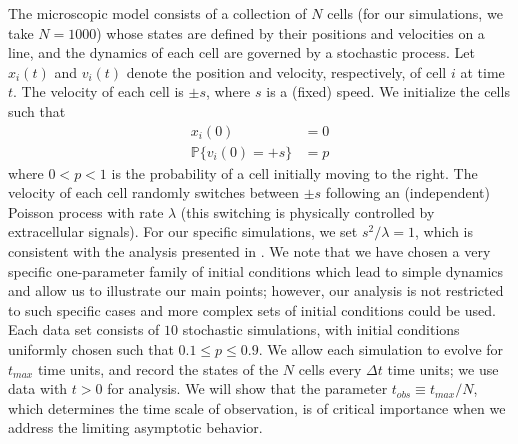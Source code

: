 \documentclass[3p]{elsarticle}
\begin{document}
The microscopic model consists of a collection of $N$ cells (for our simulations, we take $N=1000$) whose states are 
defined by their positions and velocities on a line, and the dynamics of each cell are governed by a stochastic process.
%
Let $x_i(t)$ and $v_i(t)$ denote the position and velocity, respectively, of cell $i$ at time $t$.
%
The velocity of each cell is $\pm s$, where $s$ is a (fixed) speed.
%
We initialize the cells such that
\begin{equation}\label{eqn:system}
\begin{aligned}
x_i(0) & = 0 \\
\mathbb{P} \{ v_i(0) = +s \} & = p
\end{aligned}
\end{equation}
where $0 < p < 1$ is the probability of a cell initially moving to the right.
%
The velocity of each cell randomly switches between $\pm s$ following an (independent) Poisson process with rate $\lambda$ (this switching is physically controlled by extracellular signals).
%
For our specific simulations, we set $s^2/\lambda=1$, which is consistent with the analysis presented in \cite{othmer1988models}.
%
We note that we have chosen a very specific one-parameter family of initial conditions which lead to simple dynamics and allow us to illustrate our main points;
however, our analysis is not restricted to such specific cases and more complex sets of initial conditions could be used.
%
Each data set consists of $10$ stochastic simulations, with initial conditions uniformly chosen such that $0.1 \le p  \le 0.9$.
%
We allow each simulation to evolve for $t_{max}$ time units, and record the states of the $N$ cells every $\Delta t$ time units; we use data with $t > 0$ for analysis.
%
We will show that the parameter $t_{obs} \equiv t_{max}/N$, which determines the time scale of observation, is of critical importance when we address the limiting asymptotic behavior.
\end{document}
